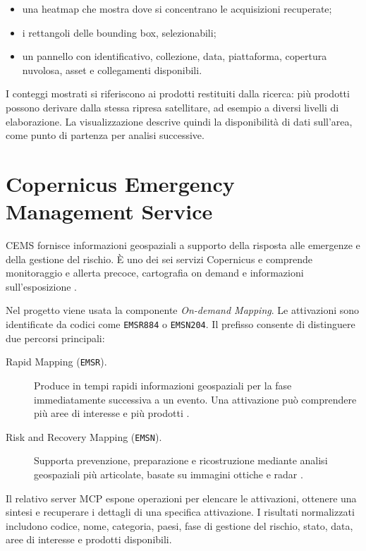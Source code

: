 \begin{itemize}
    \item una heatmap che mostra dove si concentrano le acquisizioni recuperate;
    \item i rettangoli delle bounding box, selezionabili;
    \item un pannello con identificativo, collezione, data, piattaforma,
    copertura nuvolosa, asset e collegamenti disponibili.
\end{itemize}

I conteggi mostrati si riferiscono ai prodotti restituiti dalla ricerca: più
prodotti possono derivare dalla stessa ripresa satellitare, ad esempio a
diversi livelli di elaborazione. La visualizzazione descrive quindi la
disponibilità di dati sull'area, come punto di partenza per analisi successive.

\section{Copernicus Emergency Management Service}

CEMS fornisce informazioni geospaziali a supporto della risposta alle
emergenze e della gestione del rischio. È uno dei sei servizi Copernicus e
comprende monitoraggio e allerta precoce, cartografia on demand e informazioni
sull'esposizione \cite{copernicusEMSOverview}.

Nel progetto viene usata la componente \emph{On-demand Mapping}. Le attivazioni
sono identificate da codici come \texttt{EMSR884} o \texttt{EMSN204}. Il
prefisso consente di distinguere due percorsi principali:

\begin{description}
    \item[Rapid Mapping (\texttt{EMSR}).] Produce in tempi rapidi informazioni
    geospaziali per la fase immediatamente successiva a un evento. Una
    attivazione può comprendere più aree di interesse e più prodotti
    \cite{copernicusRapidMapping}.
    \item[Risk and Recovery Mapping (\texttt{EMSN}).] Supporta prevenzione,
    preparazione e ricostruzione mediante analisi geospaziali più articolate,
    basate su immagini ottiche e radar \cite{copernicusRiskRecovery}.
\end{description}

Il relativo server MCP espone operazioni per elencare le attivazioni, ottenere
una sintesi e recuperare i dettagli di una specifica attivazione. I risultati
normalizzati includono codice, nome, categoria, paesi, fase di gestione del
rischio, stato, data, aree di interesse e prodotti disponibili.

